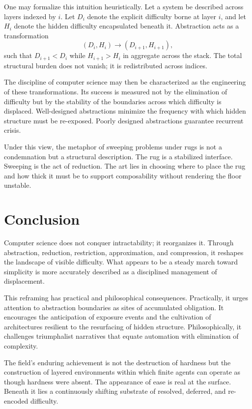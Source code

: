 \documentclass[11pt]{article}
\begin{document}
One may formalize this intuition heuristically. Let a system be described across layers indexed by $i$. Let $D_i$ denote the explicit difficulty borne at layer $i$, and let $H_i$ denote the hidden difficulty encapsulated beneath it. Abstraction acts as a transformation
\[
(D_i, H_i) \longrightarrow (D_{i+1}, H_{i+1}),
\]
such that $D_{i+1} < D_i$ while $H_{i+1} > H_i$ in aggregate across the stack. The total structural burden does not vanish; it is redistributed across indices.

The discipline of computer science may then be characterized as the engineering of these transformations. Its success is measured not by the elimination of difficulty but by the stability of the boundaries across which difficulty is displaced. Well-designed abstractions minimize the frequency with which hidden structure must be re-exposed. Poorly designed abstractions guarantee recurrent crisis.

Under this view, the metaphor of sweeping problems under rugs is not a condemnation but a structural description. The rug is a stabilized interface. Sweeping is the act of reduction. The art lies in choosing where to place the rug and how thick it must be to support composability without rendering the floor unstable.

\section{Conclusion}

Computer science does not conquer intractability; it reorganizes it. Through abstraction, reduction, restriction, approximation, and compression, it reshapes the landscape of visible difficulty. What appears to be a steady march toward simplicity is more accurately described as a disciplined management of displacement.

This reframing has practical and philosophical consequences. Practically, it urges attention to abstraction boundaries as sites of accumulated obligation. It encourages the anticipation of exposure events and the cultivation of architectures resilient to the resurfacing of hidden structure. Philosophically, it challenges triumphalist narratives that equate automation with elimination of complexity.

The field's enduring achievement is not the destruction of hardness but the construction of layered environments within which finite agents can operate as though hardness were absent. The appearance of ease is real at the surface. Beneath it lies a continuously shifting substrate of resolved, deferred, and re-encoded difficulty.
\end{document}
